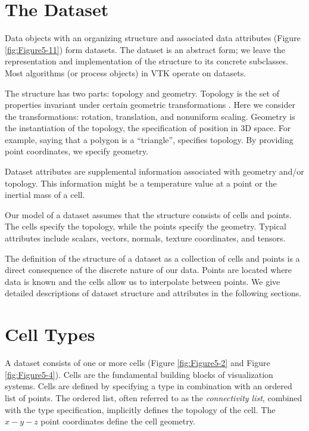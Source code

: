 \section{The Dataset}
\label{sec:dataset}

Data objects with an organizing structure and associated data attributes (Figure \ref{fig:Figure5-11}) form datasets. The dataset is an abstract form; we leave the representation and implementation of the structure to its concrete subclasses. Most algorithms (or process objects) in VTK operate on datasets.

The structure has two parts: topology and geometry. Topology is the set of properties invariant under certain geometric transformations \cite{Weiler86}. Here we consider the transformations: rotation, translation, and nonuniform scaling. Geometry is the instantiation of the topology, the specification of position in 3D space. For example, saying that a polygon is a ``triangle'', specifies topology. By providing point coordinates, we specify geometry.

Dataset attributes are supplemental information associated with geometry and/or topology. This information might be a temperature value at a point or the inertial mass of a cell.

Our model of a dataset assumes that the structure consists of cells and points. The cells specify the topology, while the points specify the geometry. Typical attributes include scalars, vectors, normals, texture coordinates, and tensors.

The definition of the structure of a dataset as a collection of cells and points is a direct consequence of the discrete nature of our data. Points are located where data is known and the cells allow us to interpolate between points. We give detailed descriptions of dataset structure and attributes in the following sections.

\section{Cell Types}
\label{sec:cell_types}

A dataset consists of one or more cells (Figure \ref{fig:Figure5-2} and Figure \ref{fig:Figure5-4}). Cells are the fundamental building blocks of visualization systems. Cells are defined by specifying a type in combination with an ordered list of points. The ordered list, often referred to as the \emph{connectivity list}, combined with the type specification, implicitly defines the topology of the cell. The $x-y-z$ point coordinates define the cell geometry.

